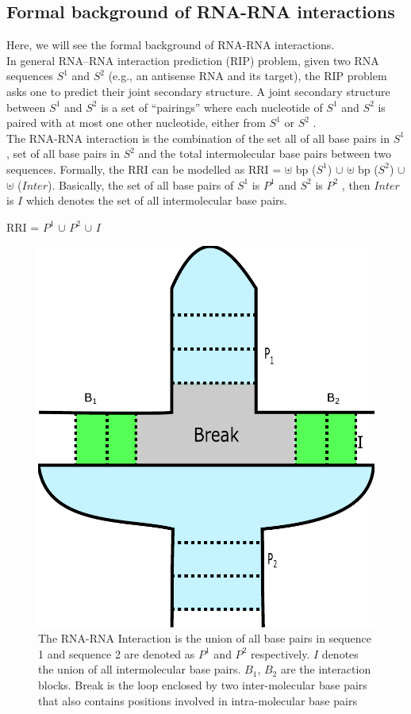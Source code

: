 \documentclass[twoside,a4paper]{report}
\begin{document}
 	\subsection{Formal background of RNA-RNA interactions}
 	Here, we will see the formal background of RNA-RNA interactions.\\
 	In general RNA–RNA interaction prediction (RIP) problem, given two RNA sequences $S^1$ and $S^2$ (e.g., an antisense RNA and its target), the RIP problem asks one to predict their joint secondary structure. A joint secondary structure between $S^1$ and $S^2$ is a set of “pairings” where each nucleotide of $S^1$ and $S^2$ is paired with at most one other nucleotide, either from $S^1$ or $S^2$ \citep{alkan2006rna}.  \\
 	
 	The RNA-RNA interaction is the combination of the set all of all base pairs in $S^1$ , set of all base pairs in $S^2$ and the total intermolecular base pairs between two sequences. Formally, the RRI can be modelled as RRI = $ \uplus $ bp ($S^1$) $ \cup $ $\uplus$ bp ($S^2$) $\cup$ $\uplus$ ($Inter$). Basically, the set of all base pairs of $S^1$ is $P^1$ and $S^2$ is $P^2$ , then $Inter$ is $I$ which denotes the set of all intermolecular base pairs. \\
 	
 		\begin{center}
 		RRI =  $P^1$ $ \cup $  $P^2$ $\cup$ $I$
 		\end{center}
 	
 
	 	\begin{figure}[tb]
		\includegraphics[width=0.6\linewidth]{rnarna.pdf}
		\centering
		\caption{The RNA-RNA Interaction is the union of all base pairs in sequence 1 and sequence 2 are denoted as $P^1$ and $P^2$ respectively. $I$ denotes the union of all intermolecular base pairs. $B_1$, $B_2$ are the interaction blocks. Break is the loop enclosed by two inter-molecular base pairs that also contains positions involved in intra-molecular base pairs}
		\label{fig:rnarna}
	\end{figure}
	
\end{document}
